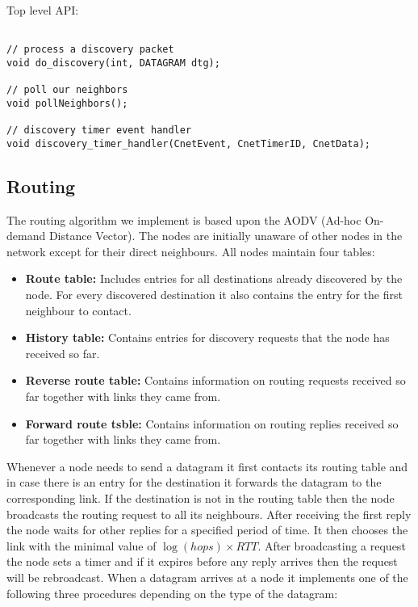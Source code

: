 \documentclass[11pt,a4paper,oneside]{report}
\begin{document}
Top level API: 
\begin{lstlisting}

// process a discovery packet
void do_discovery(int, DATAGRAM dtg);

// poll our neighbors
void pollNeighbors();

// discovery timer event handler
void discovery_timer_handler(CnetEvent, CnetTimerID, CnetData);
\end{lstlisting}
\subsection*{Routing}

The routing algorithm we implement is based upon the AODV (Ad-hoc On-demand
Distance Vector). The nodes are initially unaware of other nodes in the network except 
for their direct neighbours. All nodes maintain four tables: 
\begin{itemize}
\item \noindent \textbf{Route table:}
 Includes entries for
all destinations already discovered by the node.  For every discovered
destination it also contains the entry for the first neighbour to contact.
\item \noindent \textbf{History table:}
 Contains entries for discovery requests that the node has received so
far.
\item \noindent \textbf{Reverse route table:}
Contains information on routing requests received so far together with links they came from.
\item \noindent \textbf{Forward route tsble:} 
Contains information on routing replies received so far together with links they came from.
 
\end{itemize}
Whenever a node needs to send a datagram it first contacts its 
routing table and in case there is an entry for the destination it forwards the 
datagram to the corresponding link. If the destination is not in the routing table
then the node broadcasts the routing request to all its neighbours. After receiving the first reply the node waits for other replies for a specified period of time. It then chooses the link with the
minimal value of $\log(hops) \times RTT$. After broadcasting a request the node sets a timer and
if it expires before any reply arrives then the request will be rebroadcast. When a datagram arrives at a node it implements 
one of the following three procedures depending on the type of the datagram:
\end{document}
